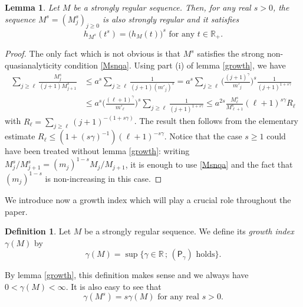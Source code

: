 \documentclass[a4paper]{amsart}
\theoremstyle{plain}
\newtheorem{lem}[subsubsection]{Lemma}
\theoremstyle{definition}
\newtheorem{deft}[subsubsection]{Definition}
\theoremstyle{remark}
\begin{document}
\begin{lem}\label{powers}
Let $ M $ be a strongly regular sequence. Then, for any real $ s>0 $, the
sequence $ M^s=(M_j^s)_{j\geq 0} $ is also strongly regular and it satisfies
\begin{equation}\label{hpowers}
h_{M^s}(t^s)=\big(h_M(t)\big)^s\text{ for any }t\in\mathbb{R}_+.
\end{equation}
\end{lem}
\begin{proof}
The only fact which is not obvious is that $ M^s $ satisfies the strong non-quasianalyticity condition \eqref{Msnqa}. Using part (i) of lemma \ref{growth}, we have
\begin{equation*}
\begin{split}
\sum_{j\geq\ell}\frac{M_j^s}{(j+1)M_{j+1}^s} & \leq a^s\sum_{j\geq\ell}\frac{1}{(j+1)
(m'_j)^s}  = a^s\sum_{j\geq\ell}\Big(\frac{(j+1)^\gamma}
{m'_j}\Big)^s\frac{1}{(j+1)^{1+s\gamma}}\\
  & \leq a^s\Big(\frac{(\ell+1)^\gamma}
{m'_\ell}\Big)^s\sum_{j\geq\ell}\frac{1}{(j+1)^{1+s\gamma}}
\leq a^{2s}\frac{M_\ell^s}{M_{\ell+1}^s}(\ell+1)^{s\gamma}
R_\ell
\end{split}
\end{equation*}
with $ R_\ell=\sum_{j\geq\ell}(j+1)^{-(1+s\gamma)} $. The result then follows from the elementary estimate $ R_\ell\leq
(1+({s\gamma})^{-1})(\ell+1)^{-s\gamma} $. Notice that the case $ s\geq 1 $ could have been treated without lemma \ref{growth}: writing $ M_j^s/M_{j+1}^s=
(m_j)^{1-s}M_j/M_{j+1} $, it is enough to use \eqref{Msnqa} and the fact
that $ (m_j)^{1-s} $ is non-increasing in this case.
\end{proof}

We introduce now a growth index which will play a crucial role throughout the paper. 

\begin{deft}\label{defgamma}
Let $ M $ be a strongly regular sequence. We
define its \emph{growth index} $ \gamma(M) $ by
\begin{equation*}
\gamma(M)=\sup\big\{\gamma\in\mathbb{R}\, ;\, (\mathsf{P}_\gamma)\text{ holds}\big\}.
\end{equation*}
\end{deft}

By lemma \ref{growth}, this definition makes sense and we always have $ 0<\gamma(M)<\infty$. It is also easy to see that 
\begin{equation}\label{gamma}
\gamma(M^s)=s\gamma(M)\text{ for any real }s>0.
\end{equation}
\end{document}

